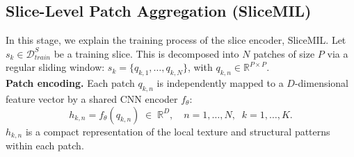 \documentclass[sigconf, screen, review, anonymous]{acmart}
\begin{document}


\subsection{Slice-Level Patch Aggregation (SliceMIL)}
\label{sec:slice}

In this stage, we explain the training process of the slice encoder, SliceMIL. Let $s_k \in \mathcal{D}^S_{train}$ be a training slice. This is decomposed into $N$ patches of size $P$ via a regular sliding window: $s_k = \{q_{k,1}, \ldots, q_{k,N}\}$, with $q_{k,n} \in \mathbb{R}^{P \times P}$. \\
%
\smallskip
\noindent\textbf{Patch encoding.}
Each patch $q_{k,n}$ is independently mapped to a $D$-dimensional feature vector by a shared CNN encoder $f_\theta$:
%
\begin{equation}
    h_{k,n} = f_\theta(q_{k,n}) \;\in\; \mathbb{R}^{D},
    \quad n = 1, \ldots, N,\;\; k = 1, \ldots, K.
    \label{eq:patch_enc}
\end{equation}
%
$h_{k,n}$ is a compact representation of the local texture and structural patterns within each patch.\\
\end{document}
